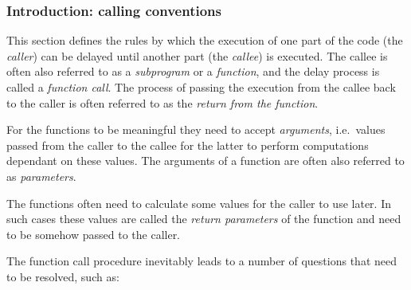 \hypertarget{functions:introduction}{
    \subsubsection{Introduction: calling conventions}
}

This section defines the rules by which the execution of one part of the code
(the \textit{caller}) can be delayed until another part (the \textit{callee})
is executed.
The callee is often also referred to as a \textit{subprogram} or
a \textit{function}, and the delay process is called a \textit{function call}.
The process of passing the execution from the callee back to the caller
is often referred to as the \textit{return from the function}.

For the functions to be meaningful they need to accept \textit{arguments},
i.e.\ values passed from the caller to the callee for the latter to perform
computations dependant on these values.
The arguments of a function are often
also referred to as \textit{parameters}.

The functions often need to calculate some values for the caller to use later.
In such cases these values are called the \textit{return parameters}
of the function and need to be somehow passed to the caller.

The function call procedure inevitably leads to a number of questions that
need to be resolved, such as:

